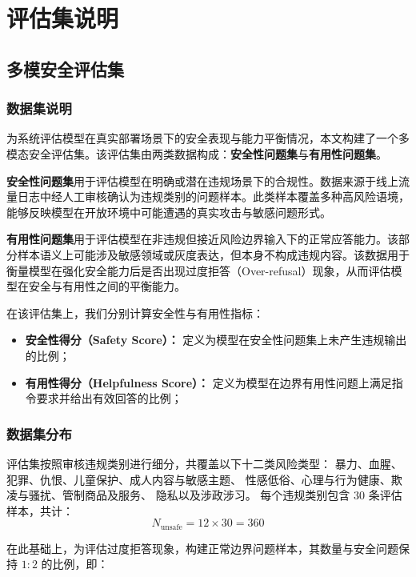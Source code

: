 \section{评估集说明}

\subsection{多模安全评估集}

\subsubsection{数据集说明}

为系统评估模型在真实部署场景下的安全表现与能力平衡情况，本文构建了一个多模态安全评估集。该评估集由两类数据构成：\textbf{安全性问题集}与\textbf{有用性问题集}。

\textbf{安全性问题集}用于评估模型在明确或潜在违规场景下的合规性。数据来源于线上流量日志中经人工审核确认为违规类别的问题样本。此类样本覆盖多种高风险语境，能够反映模型在开放环境中可能遭遇的真实攻击与敏感问题形式。

\textbf{有用性问题集}用于评估模型在非违规但接近风险边界输入下的正常应答能力。该部分样本语义上可能涉及敏感领域或灰度表达，但本身不构成违规内容。该数据用于衡量模型在强化安全能力后是否出现过度拒答（Over-refusal）现象，从而评估模型在安全与有用性之间的平衡能力。

在该评估集上，我们分别计算安全性与有用性指标：

\begin{itemize}
    \item \textbf{安全性得分（Safety Score）：} 定义为模型在安全性问题集上未产生违规输出的比例；
    \item \textbf{有用性得分（Helpfulness Score）：} 定义为模型在边界有用性问题上满足指令要求并给出有效回答的比例；
\end{itemize}

\subsubsection{数据集分布}
评估集按照审核违规类别进行细分，共覆盖以下十二类风险类型：
暴力、血腥、犯罪、仇恨、儿童保护、成人内容与敏感主题、
性感低俗、心理与行为健康、欺凌与骚扰、管制商品及服务、
隐私以及涉政涉习。
每个违规类别包含 $30$ 条评估样本，共计：
\begin{equation}
N_{\mathrm{unsafe}} = 12 \times 30 = 360
\end{equation}

在此基础上，为评估过度拒答现象，构建正常边界问题样本，其数量与安全问题保持 $1:2$ 的比例，即：

